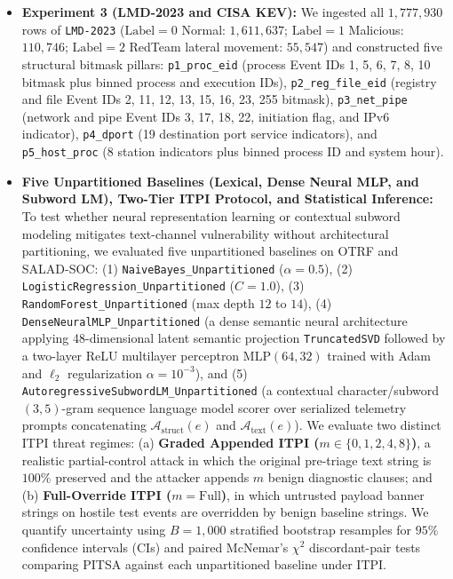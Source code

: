 \documentclass[11pt,a4paper]{article}
\let\oldtexttt\texttt
\renewcommand{\texttt}[1]{\textnormal{\oldtexttt{#1}}}
\begin{document}
\begin{itemize}
  \item \textbf{Experiment 3 (LMD-2023 and CISA KEV):} We ingested all $1,777,930$ rows of \texttt{LMD-2023} ($\text{Label}=0$ Normal: $1,611,637$; $\text{Label}=1$ Malicious: $110,746$; $\text{Label}=2$ RedTeam lateral movement: $55,547$) and constructed five structural bitmask pillars: \texttt{p1\_proc\_eid} (process Event IDs 1, 5, 6, 7, 8, 10 bitmask plus binned process and execution IDs), \texttt{p2\_reg\_file\_eid} (registry and file Event IDs 2, 11, 12, 13, 15, 16, 23, 255 bitmask), \texttt{p3\_net\_pipe} (network and pipe Event IDs 3, 17, 18, 22, initiation flag, and IPv6 indicator), \texttt{p4\_dport} (19 destination port service indicators), and \texttt{p5\_host\_proc} (8 station indicators plus binned process ID and system hour).
  \item \textbf{Five Unpartitioned Baselines (Lexical, Dense Neural MLP, and Subword LM), Two-Tier ITPI Protocol, and Statistical Inference:} To test whether neural representation learning or contextual subword modeling mitigates text-channel vulnerability without architectural partitioning, we evaluated five unpartitioned baselines on OTRF and SALAD-SOC: (1) \texttt{NaiveBayes\_\allowbreak Unpartitioned} ($\alpha = 0.5$), (2) \texttt{LogisticRegression\_\allowbreak Unpartitioned} ($C = 1.0$), (3) \texttt{RandomForest\_\allowbreak Unpartitioned} (max depth $12$ to $14$), (4) \texttt{DenseNeuralMLP\_\allowbreak Unpartitioned} (a dense semantic neural architecture applying 48-dimensional latent semantic projection \texttt{TruncatedSVD} followed by a two-layer ReLU multilayer perceptron $\text{MLP}(64, 32)$ trained with Adam and $\ell_2$ regularization $\alpha = 10^{-3}$), and (5) \texttt{AutoregressiveSubwordLM\_\allowbreak Unpartitioned} (a contextual character/subword $(3,5)$-gram sequence language model scorer over serialized telemetry prompts concatenating $\mathcal{A}_{\text{struct}}(e)$ and $\mathcal{A}_{\text{text}}(e)$). We evaluate two distinct ITPI threat regimes: (a) \textbf{Graded Appended ITPI ($m \in \{0, 1, 2, 4, 8\}$)}, a realistic partial-control attack in which the original pre-triage text string is $100\%$ preserved and the attacker appends $m$ benign diagnostic clauses; and (b) \textbf{Full-Override ITPI ($m = \text{Full}$)}, in which untrusted payload banner strings on hostile test events are overridden by benign baseline strings. We quantify uncertainty using $B = 1,000$ stratified bootstrap resamples for $95\%$ confidence intervals (CIs) and paired McNemar's $\chi^2$ discordant-pair tests comparing PITSA against each unpartitioned baseline under ITPI.
\end{itemize}
\end{document}
